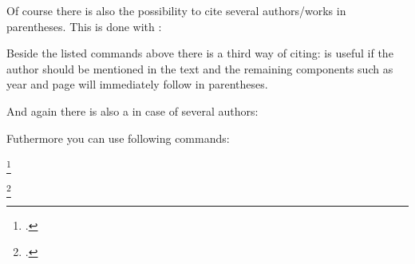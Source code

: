 \documentclass[a4paper,
10pt,
ngerman,
english
]{ltxdoc}
\begin{document}
\DescribeMacro{\parencites}
Of course there is also the possibility to cite several authors/works in parentheses.
This is done with :
 
\DescribeMacro{\textcite}
Beside the listed  commands above there is a third way of citing:
 is useful if the author should be mentioned in the text and
the remaining components such as year and page will immediately follow in parentheses. 

\DescribeMacro{\textcites}
And again there is also a  in case of several authors: 



Futhermore you can use following  commands:
\DescribeMacro{\footcite} 

\begin{example}
\footcite{Schlegel1992}
\end{example}


\DescribeMacro{\footcitetext} 

\begin{example}
\footcitetext{Schlegel1992}
\end{example}


\DescribeMacro{\smartcite} 

\begin{example}
\smartcite{Schlegel1992}
\end{example}
\end{document}
